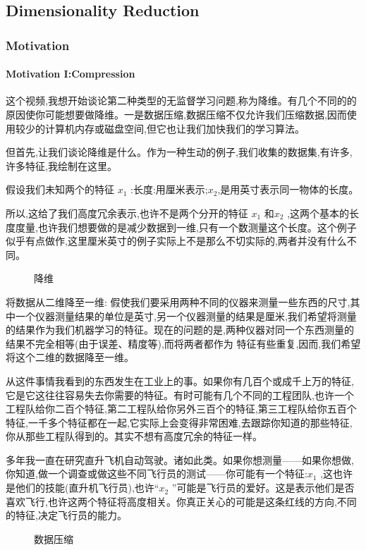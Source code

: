 \documentclass{article}
\begin{document}
\begin{CJK}{UTF8}{gbsn}
\part{Dimensionality Reduction}
\section{Motivation}
\subsection{Motivation I:Compression}
\subparagraph{}
这个视频,我想开始谈论第二种类型的无监督学习问题,称为降维。有几个不同的的原因使你可能想要做降维。一是数据压缩,数据压缩不仅允许我们压缩数据,因而使用较少的计算机内存或磁盘空间,但它也让我们加快我们的学习算法。
\subparagraph{}
但首先,让我们谈论降维是什么。作为一种生动的例子,我们收集的数据集,有许多,许多特征,我绘制在这里。
\subparagraph{}
假设我们未知两个的特征 $x_1$ :长度:用厘米表示;$x_2$,是用英寸表示同一物体的长度。
\subparagraph{}
所以,这给了我们高度冗余表示,也许不是两个分开的特征 $x_1$ 和$x_2$ ,这两个基本的长度度量,也许我们想要做的是减少数据到一维,只有一个数测量这个长度。这个例子似乎有点做作,这里厘米英寸的例子实际上不是那么不切实际的,两者并没有什么不同。
\begin{figure}[H]
\label{fig:830}
\caption{降维}
\end{figure}
\subparagraph{}
将数据从二维降至一维: 假使我们要采用两种不同的仪器来测量一些东西的尺寸,其中一个仪器测量结果的单位是英寸,另一个仪器测量的结果是厘米,我们希望将测量的结果作为我们机器学习的特征。现在的问题的是,两种仪器对同一个东西测量的结果不完全相等(由于误差、精度等),而将两者都作为 特征有些重复,因而,我们希望将这个二维的数据降至一维。
\subparagraph{}
从这件事情我看到的东西发生在工业上的事。如果你有几百个或成千上万的特征,它是它这往往容易失去你需要的特征。有时可能有几个不同的工程团队,也许一个工程队给你二百个特征,第二工程队给你另外三百个的特征,第三工程队给你五百个特征,一千多个特征都在一起,它实际上会变得非常困难,去跟踪你知道的那些特征,你从那些工程队得到的。其实不想有高度冗余的特征一样。
\subparagraph{}
多年我一直在研究直升飞机自动驾驶。诸如此类。如果你想测量——如果你想做,你知道,做一个调查或做这些不同飞行员的测试——你可能有一个特征:$x_1$ ,这也许是他们的技能(直升机飞行员),也许“$x_2$ ”可能是飞行员的爱好。这是表示他们是否喜欢飞行,也许这两个特征将高度相关。你真正关心的可能是这条红线的方向,不同的特征,决定飞行员的能力。
\begin{figure}[H]
\label{fig:832}
\caption{数据压缩}

\end{figure}
\end{CJK}
\end{document}
